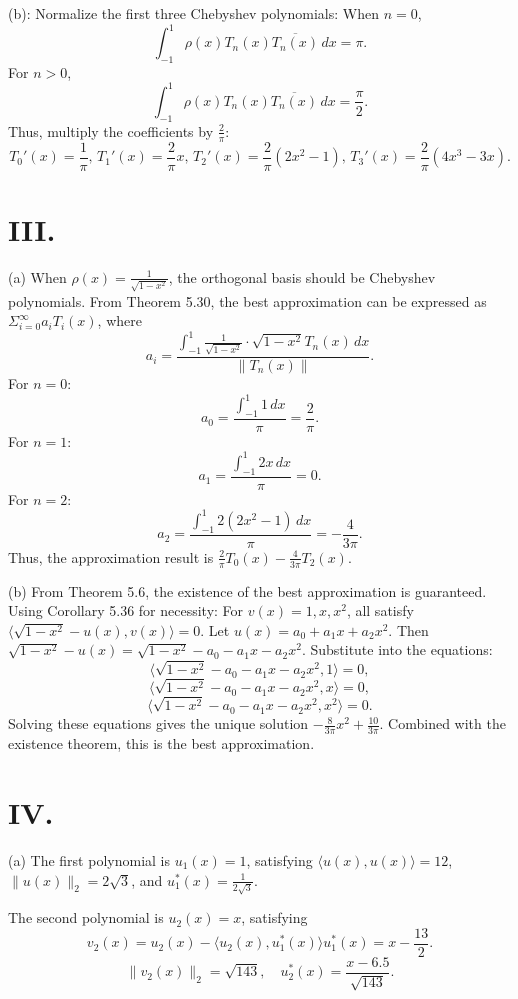 \documentclass[a4paper]{article}
\begin{document}
(b):  
Normalize the first three Chebyshev polynomials:  
When \( n=0 \),  
\[
\int_{-1}^{1} \rho(x) T_n(x) \overline{T_n(x)} \, dx = \pi.
\]
For \( n > 0 \),  
\[
\int_{-1}^{1} \rho(x) T_n(x) \overline{T_n(x)} \, dx = \frac{\pi}{2}.
\]
Thus, multiply the coefficients by \( \frac{2}{\pi} \):  
\[
T_0'(x) = \frac{1}{\pi}, \, T_1'(x) = \frac{2}{\pi}x, \, T_2'(x) = \frac{2}{\pi}(2x^2-1), \, T_3'(x) = \frac{2}{\pi}(4x^3-3x).
\]
\section*{III.}
(a)  
When \(\rho(x) = \frac{1}{\sqrt{1-x^2}}\), the orthogonal basis should be Chebyshev polynomials.  
From Theorem 5.30, the best approximation can be expressed as \(\Sigma_{i=0}^{\infty}a_iT_i(x)\), where  
\[
a_i = \frac{\int_{-1}^{1} \frac{1}{\sqrt{1-x^2}} \cdot \sqrt{1-x^2} T_n(x) \, dx}{\|T_n(x)\|}.
\]  
For \(n=0\):  
\[
a_0 = \frac{\int_{-1}^{1} 1 \, dx}{\pi} = \frac{2}{\pi}.
\]  
For \(n=1\):  
\[
a_1 = \frac{\int_{-1}^{1} 2x \, dx}{\pi} = 0.
\]  
For \(n=2\):  
\[
a_2 = \frac{\int_{-1}^{1} 2(2x^2-1) \, dx}{\pi} = -\frac{4}{3\pi}.
\]  
Thus, the approximation result is \(\frac{2}{\pi}T_0(x) - \frac{4}{3\pi}T_2(x)\).

(b)  
From Theorem 5.6, the existence of the best approximation is guaranteed.  
Using Corollary 5.36 for necessity:  
For \(v(x) = 1, x, x^2\), all satisfy \(\langle \sqrt{1-x^2} - u(x), v(x) \rangle = 0\).  
Let \(u(x) = a_0 + a_1x + a_2x^2\).  
Then \(\sqrt{1-x^2} - u(x) = \sqrt{1-x^2} - a_0 - a_1x - a_2x^2\).  
Substitute into the equations:  
\[
\langle \sqrt{1-x^2} - a_0 - a_1x - a_2x^2, 1 \rangle = 0,
\]  
\[
\langle \sqrt{1-x^2} - a_0 - a_1x - a_2x^2, x \rangle = 0,
\]  
\[
\langle \sqrt{1-x^2} - a_0 - a_1x - a_2x^2, x^2 \rangle = 0.
\]  
Solving these equations gives the unique solution \(-\frac{8}{3\pi}x^2 + \frac{10}{3\pi}\).  
Combined with the existence theorem, this is the best approximation.

\section*{IV.}
(a)  
The first polynomial is \(u_1(x) = 1\), satisfying \(\langle u(x), u(x) \rangle = 12\), \(\|u(x)\|_2 = 2\sqrt{3}\), and \(u_1^*(x) = \frac{1}{2\sqrt{3}}\).  

The second polynomial is \(u_2(x) = x\), satisfying  
\[
v_2(x) = u_2(x) - \langle u_2(x), u_1^*(x) \rangle u_1^*(x) = x - \frac{13}{2}.
\]  
\[
\|v_2(x)\|_2 = \sqrt{143}, \quad u_2^*(x) = \frac{x - 6.5}{\sqrt{143}}.
\]  
\end{document}
